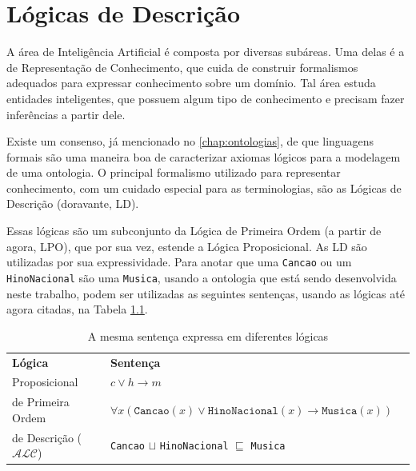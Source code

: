 \chapter{Lógicas de Descrição}
\label{chap:logicas}

\lettrine{A}{} área de Inteligência Artificial é composta por diversas subáreas. Uma delas é a de Representação de Conhecimento, que cuida de construir formalismos adequados para expressar conhecimento sobre um domínio. Tal área estuda entidades inteligentes, que possuem algum tipo de conhecimento e precisam fazer inferências a partir dele.

Existe um consenso, já mencionado no \autoref{chap:ontologias}, de que linguagens formais são uma maneira boa de caracterizar axiomas lógicos para a modelagem de uma ontologia. O principal formalismo utilizado para representar conhecimento, com um cuidado especial para as terminologias, são as Lógicas de Descrição (doravante, LD).

Essas lógicas são um subconjunto da Lógica de Primeira Ordem (a partir de agora, LPO), que por sua vez, estende a Lógica Proposicional. As LD são utilizadas por sua expressividade. Para anotar que uma \texttt{Cancao} ou um \texttt{HinoNacional} são uma \texttt{Musica}, usando a ontologia que está sendo desenvolvida neste trabalho, podem ser utilizadas as seguintes sentenças, usando as lógicas até agora citadas, na Tabela \ref{tab:equiv}.

\begin{table}[H]
	\centering
	\begin{tabular}{|l|l|l}
		\cline{1-2}
		\textbf{Lógica}                           & \textbf{Sentença}                                                                             & \\ \cline{1-2}
		Proposicional                    & $c \lor h \to m$                                                                     & \\ \cline{1-2}
		de Primeira Ordem                & $\forall x(\texttt{Cancao}(x) \lor \texttt{HinoNacional}(x) \to \texttt{Musica}(x))$ & \\ \cline{1-2}
		de Descrição ($ \mathcal{ALC} $) & \texttt{Cancao} $\sqcup$ \texttt{HinoNacional} $\sqsubseteq$ \texttt{Musica}         & \\ \cline{1-2}
	\end{tabular}
	\caption{A mesma sentença expressa em diferentes lógicas}
	\label{tab:equiv}
\end{table}

